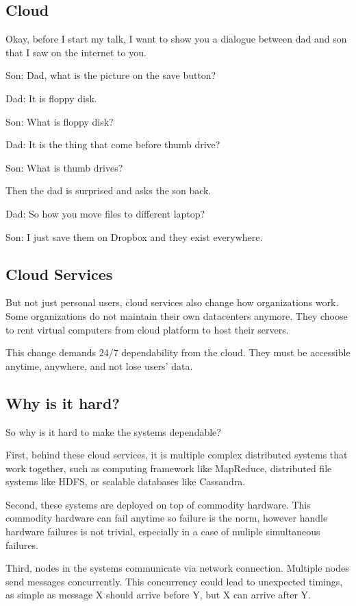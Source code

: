 \subsection{Cloud}

Okay, before I start my talk, I want to show you a dialogue between dad and son
that I saw on the internet to you.

Son: Dad, what is the picture on the save button?

Dad: It is floppy disk.

Son: What is floppy disk?

Dad: It is the thing that come before thumb drive?

Son: What is thumb drives?

Then the dad is surprised and asks the son back.

Dad: So how you move files to different laptop?

Son: I just save them on Dropbox and they exist everywhere.

\subsection{Cloud Services}

But not just personal users, cloud services also change how organizations work.
Some organizations do not maintain their own datacenters anymore. They choose
to
rent virtual computers from cloud platform to host their servers.

This change demands 24/7 dependability from the cloud. They must be accessible
anytime, anywhere, and not lose users' data.

\subsection{Why is it hard?}

So why is it hard to make the systems dependable?

First, behind these cloud services, it is multiple complex distributed systems
that work together, such as computing framework like MapReduce, distributed file
systems like HDFS, or scalable databases like Cassandra.

Second, these systems are deployed on top of commodity hardware. This commodity
hardware can fail anytime so failure is the norm, however handle hardware
failures is not trivial, especially in a case of muliple simultaneous failures.

Third, nodes in the systems communicate via network connection. Multiple nodes
send messages concurrently. This concurrency could lead to unexpected timings,
as simple as message X should arrive before Y, but X can arrive after Y.

